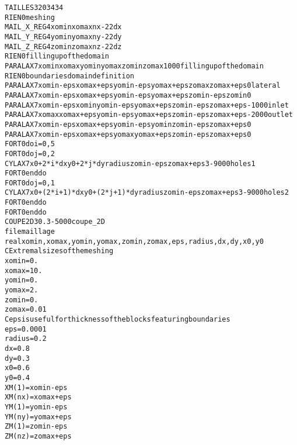\begin{alltt}
TAILLES 3 203 43 4 
RIEN 0 meshing
MAIL_X_REG 4 xomin xomax nx-2 2 dx
MAIL_Y_REG 4 yomin yomax ny-2 2 dy
MAIL_Z_REG 4 zomin zomax nz-2 2 dz
RIEN 0 filling up of the domain
PARALAX 7 xomin xomax yomin yomax zomin zomax 1000 filling up of the domain
RIEN 0 boundaries domain definition
PARALAX 7 xomin-eps xomax+eps yomin-eps yomax+eps zomax zomax+eps 0 lateral
PARALAX 7 xomin-eps xomax+eps yomin-eps yomax+eps zomin-eps zomin 0 
PARALAX 7 xomin-eps xomin yomin-eps yomax+eps zomin-eps zomax+eps -1000 inlet
PARALAX 7 xomax xomax+eps yomin-eps yomax+eps zomin-eps zomax+eps -2000 outlet
PARALAX 7 xomin-eps xomax+eps yomin-eps yomin zomin-eps zomax+eps 0 
PARALAX 7 xomin-eps xomax+eps yomax yomax+eps zomin-eps zomax+eps 0 
FORT 0 do i=0,5
FORT 0 do j=0,2
CYLAX 7 x0+2*i*dx y0+2*j*dy radius zomin-eps zomax+eps 3 -9000 holes1
FORT 0 enddo
FORT 0 do j=0,1
CYLAX 7 x0+(2*i+1)*dx y0+(2*j+1)*dy radius zomin-eps zomax+eps 3 -9000 holes2
FORT 0 enddo
FORT 0 enddo
COUPE2D 3 0. 3 -5000 coupe_2D
file maillage
        real xomin,xomax,yomin,yomax,zomin,zomax,eps,radius,dx,dy, x0, y0
C       Extremal sizes of the meshing
        xomin=0.
        xomax=10.
        yomin=0.
        yomax=2.
        zomin=0.
        zomax=0.01
C       eps is useful for thickness of the blocks featuring boundaries
        eps=0.0001
        radius=0.2
        dx=0.8
        dy=0.3
        x0=0.6
        y0=0.4
        XM(1)=xomin-eps
        XM(nx)=xomax+eps
        YM(1)=yomin-eps
        YM(ny)=yomax+eps
        ZM(1)=zomin-eps
        ZM(nz)=zomax+eps
\end{alltt}

